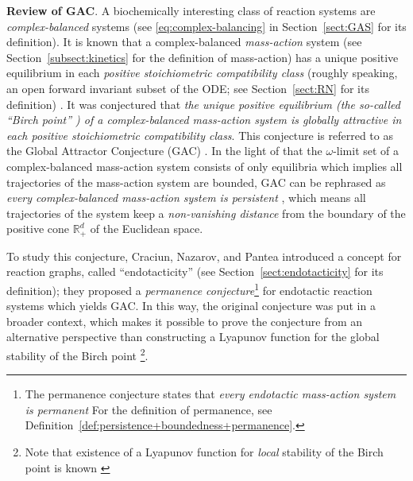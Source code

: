 \documentclass[10pt]{amsart}
\numberwithin{equation}{section}
\theoremstyle{plain}
\theoremstyle{definition}
\theoremstyle{remark}
\begin{document}
\noindent\textbf{Review of GAC}. {A biochemically interesting class of reaction systems are \emph{complex-balanced} systems  \cite{F19} (see \eqref{eq:complex-balancing} in Section~\ref{sect:GAS} for its definition). It is known that a complex-balanced \emph{mass-action} system (see Section~\ref{subsect:kinetics} for the definition of mass-action) has a unique positive equilibrium in each \emph{positive stoichiometric compatibility class}  (roughly speaking, an open forward invariant subset of the ODE; see Section~\ref{sect:RN} for its definition) \cite{F87,G03}. It was conjectured that
\emph{the unique positive equilibrium (the so-called ``Birch point'' \cite{CDSS09}) of a complex-balanced mass-action system is globally attractive  in  each positive stoichiometric compatibility class}. This conjecture is referred to as the {Global Attractor Conjecture} (GAC) \cite{HJ72}. In the light of that the $\omega$-limit set of a complex-balanced mass-action system consists of only equilibria \cite{F87,SM00,S01} which implies all trajectories of the mass-action system are bounded, GAC can be rephrased as \emph{every complex-balanced mass-action system is persistent} \cite{CNP13,GMS14}, which means all trajectories of the system keep a \emph{non-vanishing distance} from the boundary of the positive cone $\mathbb{R}^d_+$ of the Euclidean space.}

{To study this conjecture, 
Craciun, Nazarov, and Pantea introduced a concept for reaction graphs, called ``endotacticity'' \cite{CNP13} (see Section~\ref{sect:endotacticity} for its definition); they proposed a \emph{permanence conjecture}\footnote{The permanence conjecture states that \emph{every endotactic mass-action system is permanent} For the definition of permanence, see Definition~\ref{def:persistence+boundedness+permanence}.}
 for endotactic reaction systems which yields GAC. In this way, the original conjecture was put in a broader context, which makes it possible to   prove the conjecture from an alternative perspective than constructing a Lyapunov function for the global stability of the Birch point \footnote{Note that existence of a  Lyapunov function for \emph{local} stability of the Birch point is known \cite{F79}}.}
\end{document}
